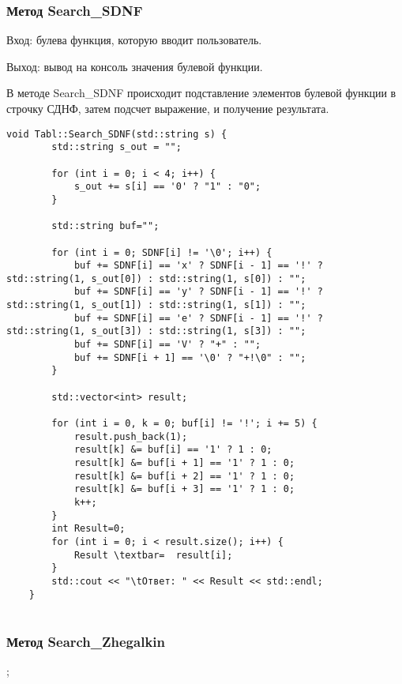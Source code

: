 \documentclass[10pt,a4paper,final]{article} %
\begin{document}
\subsubsection{Метод Search\_SDNF}
\par Вход: булева функция, которую вводит пользователь.
\par Выход: вывод на консоль значения булевой функции.
\par В методе Search\_SDNF происходит подставление элементов булевой функции в строчку СДНФ, затем подсчет выражение, и получение результата.
\begin{lstlisting}[caption={Метод Search\_SDNF}]
	void Tabl::Search_SDNF(std::string s) {
		std::string s_out = "";
		
		for (int i = 0; i < 4; i++) {
			s_out += s[i] == '0' ? "1" : "0";
		}
		
		std::string buf="";
		
		for (int i = 0; SDNF[i] != '\0'; i++) {
			buf += SDNF[i] == 'x' ? SDNF[i - 1] == '!' ? std::string(1, s_out[0]) : std::string(1, s[0]) : "";
			buf += SDNF[i] == 'y' ? SDNF[i - 1] == '!' ? std::string(1, s_out[1]) : std::string(1, s[1]) : "";
			buf += SDNF[i] == 'e' ? SDNF[i - 1] == '!' ? std::string(1, s_out[3]) : std::string(1, s[3]) : "";
			buf += SDNF[i] == 'V' ? "+" : "";
			buf += SDNF[i + 1] == '\0' ? "+!\0" : "";
		}
		
		std::vector<int> result;
		
		for (int i = 0, k = 0; buf[i] != '!'; i += 5) {
			result.push_back(1);
			result[k] &= buf[i] == '1' ? 1 : 0;
			result[k] &= buf[i + 1] == '1' ? 1 : 0;
			result[k] &= buf[i + 2] == '1' ? 1 : 0;
			result[k] &= buf[i + 3] == '1' ? 1 : 0;
			k++;
		}
		int Result=0;
		for (int i = 0; i < result.size(); i++) {
			Result \textbar=  result[i];
		}
		std::cout << "\tОтвет: " << Result << std::endl;
	}
	
\end{lstlisting}

\subsubsection{Метод Search\_Zhegalkin};
\end{document}
